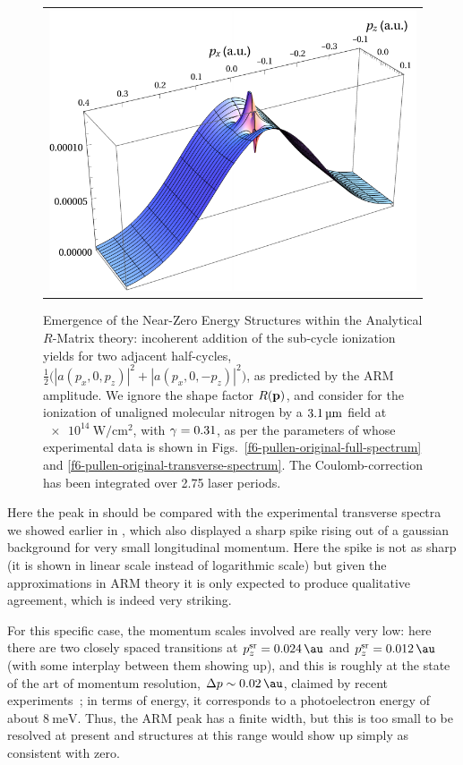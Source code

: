 \begin{figure}[htb]
  \centering
  \begin{tabular}{c}
    \includegraphics[width=0.7\columnwidth]{6-LES/Figures/figure6-2B.pdf}
  \end{tabular}
  \caption[
  ARM photoelectron spectra showing Near-Zero Energy Structures
  ]{
  Emergence of the Near-Zero Energy Structures within the Analytical $R$-Matrix theory: incoherent addition of the sub-cycle ionization yields for two adjacent half-cycles, $\tfrac12\big(\left|a(p_x,0,p_z)\right|^2+\left|a(p_x,0,-p_z)\right|^2\big)$, as predicted by the ARM amplitude.
  We ignore the shape factor $R(\vb{p})$, and consider for the ionization of unaligned molecular nitrogen by a $\SI{3.1}{\micro\meter}$ field at $\SI{e14}{\watt/\centi\meter^2}$, with $\gamma=0.31$, as per the parameters of  whose experimental data is shown in Figs.~\ref{f6-pullen-original-full-spectrum} and \ref{f6-pullen-original-transverse-spectrum}. The Coulomb-correction has been integrated over 2.75 laser periods. 
  }
  \label{f6-po-pp-spectrum}
\end{figure}


Here the peak in  should be compared with the experimental transverse spectra we showed earlier in , which also displayed a sharp spike rising out of a gaussian background for very small longitudinal momentum. Here the spike is not as sharp (it is shown in linear scale instead of logarithmic scale) but given the approximations in ARM theory it is only expected to produce qualitative agreement, which is indeed very striking. 

For this specific case, the momentum scales involved are really very low: here there are two closely spaced transitions at $\pzsr{}= \SI{ \figuresixtwoBfirstpztransition }{\au}$ and $\pzsr{}=\SI{\figuresixtwoBthirdpztransition}{\au}$ (with some interplay between them showing up), and this is roughly at the state of the art of momentum resolution, $\Delta p\sim\SI{0.02}{\au}$, claimed by recent experiments~\cite{ pullen_kinematically_2014, Wolter_PRX}; in terms of energy, it corresponds to a photoelectron energy of about $\SI{8}{\milli\electronvolt}$. Thus, the ARM peak has a finite width, but this is too small to be resolved at present and structures at this range would show up simply as consistent with zero.


